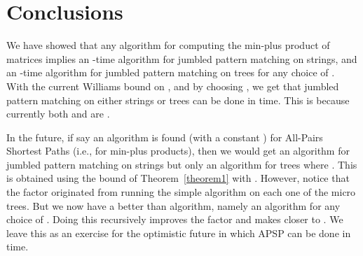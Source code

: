 \documentclass[11pt]{llncs}
\begin{document}
\section{Conclusions}
We have showed that any  algorithm for computing the min-plus product of  matrices implies an -time algorithm for  jumbled pattern matching on strings, and an -time algorithm for jumbled pattern matching on trees for any choice of . With the current Williams bound on , and by choosing , we get that jumbled pattern matching on either strings or trees can be done in  time. This is because currently both  and  are .

In the future, if say an  algorithm is found (with a constant ) for All-Pairs Shortest Paths (i.e., for min-plus products), then we would get an  algorithm for jumbled pattern matching on strings but only an  algorithm for trees where .  This is obtained using the  bound of Theorem~\ref{theorem1} with . However, notice that the  factor originated from running the simple  algorithm on each one of the  micro trees. But we now have a better than  algorithm, namely an  algorithm for any choice of . Doing this recursively improves the  factor and makes  closer to . We leave this as an exercise for the optimistic future in which APSP can be done in  time.






\end{document}
